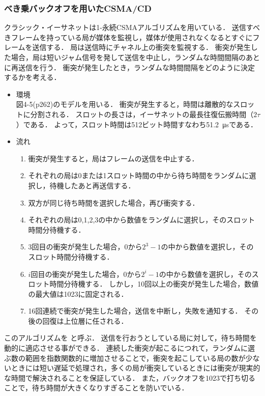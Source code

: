 \documentclass[a4paper]{ltjsarticle}
\begin{document}
\subsubsection*{べき乗バックオフを用いたCSMA/CD}\label{ux3079ux304dux4e57ux30d0ux30c3ux30afux30aaux30d5ux3092ux7528ux3044ux305fcsmacd}

クラシック・イーサネットは1-永続CSMAアルゴリズムを用いている．
送信すべきフレームを持っている局が媒体を監視し，媒体が使用されなくなるとすぐにフレームを送信する．
局は送信時にチャネル上の衝突を監視する．
衝突が発生した場合，局は短いジャム信号を発して送信を中止し，ランダムな時間間隔のあとに再送信を行う．
衝突が発生したとき，ランダムな時間間隔をどのように決定するかを考える．

\begin{itemize}
\item
  環境\\
  図4-5(p262)のモデルを用いる．
  衝突が発生すると，時間は離散的なスロットに分割される．
  スロットの長さは，イーサネットの最長往復伝搬時間（\(2\tau\)）である．
  よって，スロット時間は512ビット時間すなわち\SI{51.2}{\micro s}である．
\item
  流れ

  \begin{enumerate}
  \item
    衝突が発生すると，局はフレームの送信を中止する．
  \item
    それぞれの局は0または1スロット時間の中から待ち時間をランダムに選択し，待機したあと再送信する．
  \item
    双方が同じ待ち時間を選択した場合，再び衝突する．
  \item
    それぞれの局は0,1,2,3の中から数値をランダムに選択し，そのスロット時間分待機する．
  \item
    3回目の衝突が発生した場合，0から\(2^3 - 1\)の中から数値を選択し，そのスロット時間分待機する．
  \item
    \(i\)回目の衝突が発生した場合，0から\(2^i - 1\)の中から数値を選択し，そのスロット時間分待機する．
    しかし，10回以上の衝突が発生した場合，数値の最大値は1023に固定される．
  \item
    16回連続で衝突が発生した場合，送信を中断し，失敗を通知する．
    その後の回復は上位層に任される．
  \end{enumerate}
\end{itemize}

このアルゴリズムを  と呼ぶ．
送信を行おうとしている局に対して，待ち時間を動的に適応させる事ができる．
連続した衝突が起こるにつれて，ランダムに選ぶ数の範囲を指数関数的に増加させることで，衝突を起こしている局の数が少ないときには短い遅延で処理され，多くの局が衝突しているときには衝突が現実的な時間で解決されることを保証している．
また，バックオフを1023で打ち切ることで，待ち時間が大きくなりすぎることを防いでいる．
\end{document}
